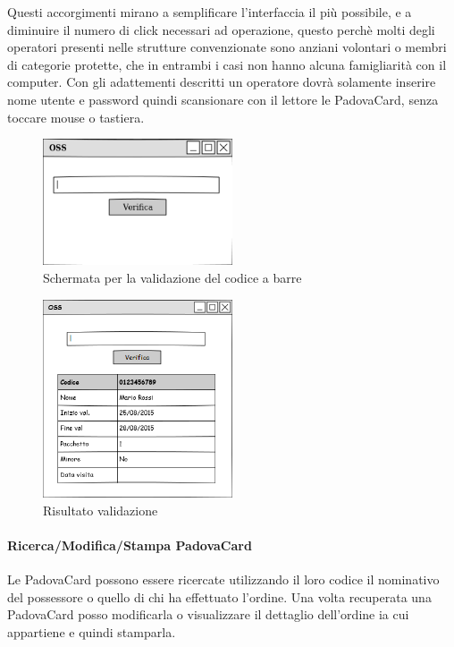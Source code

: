 Questi accorgimenti mirano a semplificare l'interfaccia il più possibile, e a diminuire il numero di click necessari ad operazione, questo perchè molti degli operatori presenti nelle strutture convenzionate sono anziani volontari o membri di categorie protette, che in entrambi i casi non hanno alcuna famigliarità con il computer.
Con gli adattementi descritti un operatore dovrà solamente inserire nome utente e password quindi scansionare con il lettore le PadovaCard, senza toccare mouse o tastiera.
\begin{figure}[H]
\centering
\includegraphics[width=0.5\textwidth]{images/mockup_leggi_barcode.png}
\caption{Schermata per la validazione del codice a barre\label{validazionecodicebarre}}
\end{figure}

\begin{figure}[H]
\centering
\includegraphics[width=0.5\textwidth]{images/mockup_leggi_barcode2.png}
\caption{Risultato validazione}
\end{figure}


\paragraph{Ricerca/Modifica/Stampa PadovaCard}

Le PadovaCard possono essere ricercate utilizzando il loro codice il nominativo del possessore o quello di chi ha effettuato l'ordine. Una volta recuperata una PadovaCard posso modificarla o visualizzare il dettaglio dell'ordine ia cui appartiene e quindi stamparla. \\

